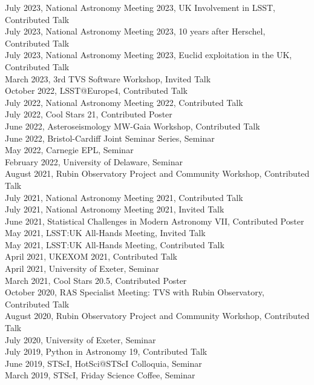 \documentclass[letter, margin, 10pt]{res} %
\begin{document}
\begin{resume}
July 2023, National Astronomy Meeting 2023, UK Involvement in LSST, Contributed Talk\\
July 2023, National Astronomy Meeting 2023, 10 years after Herschel, Contributed Talk\\
July 2023, National Astronomy Meeting 2023, Euclid exploitation in the UK, Contributed Talk\\
March 2023, 3rd TVS Software Workshop, Invited Talk\\
October 2022, LSST@Europe4, Contributed Talk\\
July 2022, National Astronomy Meeting 2022, Contributed Talk\\
July 2022, Cool Stars 21, Contributed Poster\\
June 2022, Asteroseismology MW-Gaia Workshop, Contributed Talk\\
June 2022, Bristol-Cardiff Joint Seminar Series, Seminar\\
May 2022, Carnegie EPL, Seminar\\
February 2022, University of Delaware, Seminar\\
August 2021, Rubin Observatory Project and Community Workshop, Contributed Talk\\
July 2021, National Astronomy Meeting 2021, Contributed Talk\\
July 2021, National Astronomy Meeting 2021, Invited Talk\\
June 2021, Statistical Challenges in Modern Astronomy VII, Contributed Poster\\
May 2021, LSST:UK All-Hands Meeting, Invited Talk\\
May 2021, LSST:UK All-Hands Meeting, Contributed Talk\\
April 2021, UKEXOM 2021, Contributed Talk\\
April 2021, University of Exeter, Seminar\\
March 2021, Cool Stars 20.5, Contributed Poster\\
October 2020, RAS Specialist Meeting: TVS with Rubin Observatory, Contributed Talk\\
August 2020, Rubin Observatory Project and Community Workshop, Contributed Talk\\
July 2020, University of Exeter, Seminar\\
July 2019, Python in Astronomy 19, Contributed Talk\\
June 2019, STScI, HotSci@STScI Colloquia, Seminar\\
March 2019, STScI, Friday Science Coffee, Seminar\\

\end{resume}
\end{document}
